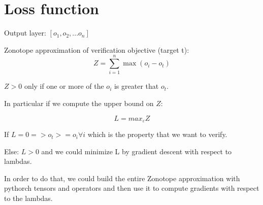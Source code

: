 \documentclass{article}
\newcommand{\eps}{\varepsilon}
\begin{document}
\section{Loss function}

Output layer: $[o_1, o_2, ... o_n]$

Zonotope approximation of verification objective (target t):
\begin{equation}
Z = \sum_{i=1}^{n} \max(o_i - o_t)
\end{equation}

$Z > 0$ only if one or more of the $o_i$ is greater that $o_t$.

In particular if we compute the upper bound on $Z$:

\begin{equation}
L = max_\eps Z
\end{equation}

If $L = 0 => o_t >= o_i \forall i$ which is the property that we want to verify.

Else: $L > 0$ and we could minimize L by gradient descent with respect to lambdas.

In order to do that, we could build the entire Zonotope approximation with pythorch tensors and operators and then use it to compute gradients with respect to the lambdas.
\end{document}

